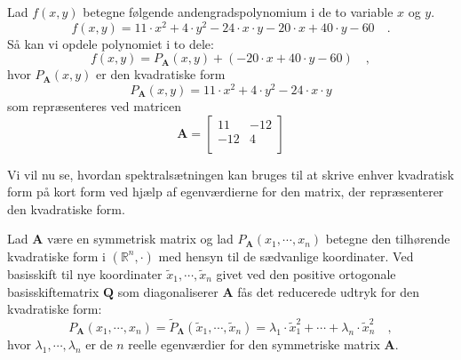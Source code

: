 \begin{example}\label{exampKvadFormFraPol}
Lad $f(x,y)$ betegne følgende andengradspolynomium i de to variable $x$ og $y$.
\begin{equation}
f(x,y) = 11\cdot x^{2} + 4\cdot y^{2} - 24\cdot x\cdot y - 20\cdot x + 40\cdot y - 60 \quad.
\end{equation}
Så kan vi opdele polynomiet i to dele:
\begin{equation}
f(x,y) = P_{\mathbf{A}}(x,y) + (- 20\cdot x + 40\cdot y - 60) \quad,
\end{equation}
hvor $P_{\mathbf{A}}(x,y)$ er den kvadratiske form
\begin{equation}
P_{\mathbf{A}}(x,y) = 11\cdot x^{2} + 4\cdot y^{2} - 24\cdot x\cdot y
\end{equation}
som repræsenteres ved matricen
\begin{equation} \label{eqReprA}
\mathbf{A} = \left[
               \begin{array}{cc}
                 11 & -12 \\
                 -12 & 4 \\
               \end{array}
             \right]
\end{equation}
\end{example}

Vi vil nu se, hvordan spektralsætningen kan bruges til at skrive enhver kvadratisk form på kort form ved hjælp af egenværdierne for den matrix, der repræsenterer den kvadratiske form.

\begin{theorem} \label{KvadFormReduk}
Lad $\mathbf{A}$ være en symmetrisk matrix og lad $P_{\mathbf{A}}(x_{1}, \cdots , x_{n})$ betegne den tilhørende kvadratiske form i $(\mathbb{R}^{n}, \bm{\cdot})$ med hensyn til de sædvanlige koordinater. Ved basisskift til nye koordinater
$\widetilde{x}_{1}, \cdots , \widetilde{x}_{n}$ givet ved den positive ortogonale
basisskiftematrix $\mathbf{Q}$ som diagonaliserer $\mathbf{A}$ fås det reducerede udtryk for den kvadratiske form:
\begin{equation}
P_{\mathbf{A}}(x_{1}, \cdots , x_{n}) = \widetilde{P}_{\bm{\Lambda}}(\widetilde{x}_{1}, \cdots , \widetilde{x}_{n})  = \lambda_{1}\cdot \widetilde{x}_{1}^{2} + \cdots + \lambda_{n}\cdot \widetilde{x}_{n}^{2} \quad,
\end{equation}
hvor $\lambda_{1}, \cdots , \lambda_{n}$ er de $n$ reelle egenværdier for den symmetriske matrix $\mathbf{A}$.
\end{theorem}

